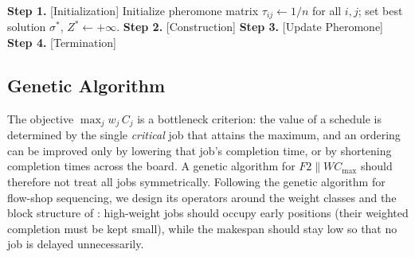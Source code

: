 \documentclass[12pt]{article}
\let\origsubsection\subsection
\renewcommand{\subsection}{\FloatBarrier\origsubsection}
\begin{document}
\begin{sloppypar}
\begin{algorithm}[]
\small
\linespread{1.2}\selectfont
\SetAlgoLined
\DontPrintSemicolon
\caption{Ant Colony Optimization for $F2 \parallel W C_{\max}$}\label{alg:aco}
\BlankLine
\textbf{Step 1.} [Initialization] Initialize pheromone matrix $\tau_{ij}\gets 1/n$ for all $i,j$; 
			set best solution $\sigma^*$, $Z^* \gets +\infty$.\;
\textbf{Step 2.} [Construction] 
\textbf{Step 3.} [Update Pheromone] 
\textbf{Step 4.} [Termination]  \;
\end{algorithm}



\subsection{Genetic Algorithm}
\label{sub:ga}

The objective $\max_{j} w_j\,C_j$ is a bottleneck criterion: the value of a schedule is
determined by the single \emph{critical} job that attains the maximum, and an ordering can be
improved only by lowering that job's completion time, or by shortening completion times across
the board. A genetic algorithm for $F2 \parallel W C_{\max}$ should therefore not treat all
jobs symmetrically. Following the genetic algorithm \citep{reeves1995} for flow-shop
sequencing, we design its operators around the weight classes and the block structure
of : high-weight jobs should occupy early positions (their
weighted completion must be kept small), while the makespan should stay low so that no job is
delayed unnecessarily.


\end{sloppypar}
\end{document}

